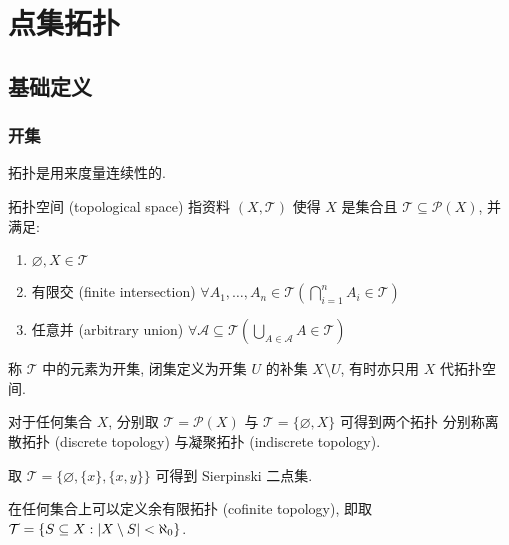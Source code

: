 \section{点集拓扑}

\subsection{基础定义}

\subsubsection{开集}

拓扑是用来度量连续性的.

\begin{definition}[拓扑空间]
    拓扑空间 (topological space) 指资料 \((X,\mathcal{T})\) 使得 \(X\) 是集合且 \(\mathcal{T} \subseteq \mathcal{P}(X)\), 并满足:
    \begin{enumerate}
        \item \(\varnothing, X \in \mathcal{T}\)
        \item 有限交 (finite intersection) \(\forall A_1, \dots, A_n \in \mathcal{T} (\bigcap_{i=1}^n A_i \in \mathcal{T})\)
        \item 任意并 (arbitrary union) \(\forall \mathcal{A} \subseteq \mathcal{T} (\bigcup_{A \in \mathcal{A}} A \in \mathcal{T})\)
    \end{enumerate}
    称 \(\mathcal{T}\) 中的元素为开集, 闭集定义为开集 \(U\) 的补集 \(X \setminus U\), 有时亦只用 \(X\) 代拓扑空间.
\end{definition}

\begin{definition}
    对于任何集合 \(X\), 分别取 \(\mathcal{T} = \mathcal{P} (X)\) 与 \(\mathcal{T} = \{\varnothing,X\}\) 可得到两个拓扑
    分别称离散拓扑 (discrete topology) 与凝聚拓扑 (indiscrete topology).
\end{definition}

\begin{example}
    \label {example:sierpinski two point set}
    取 \(\mathcal{T} = \{\varnothing, \{x\}, \{x,y\}\}\) 可得到 Sierpinski 二点集.
\end{example}

\begin{example}
    在任何集合上可以定义余有限拓扑 (cofinite topology), 即取 \(\mathcal{T} = \{S \subseteq X : \abs{X \setminus S} < \aleph_0\}\).
\end{example}

